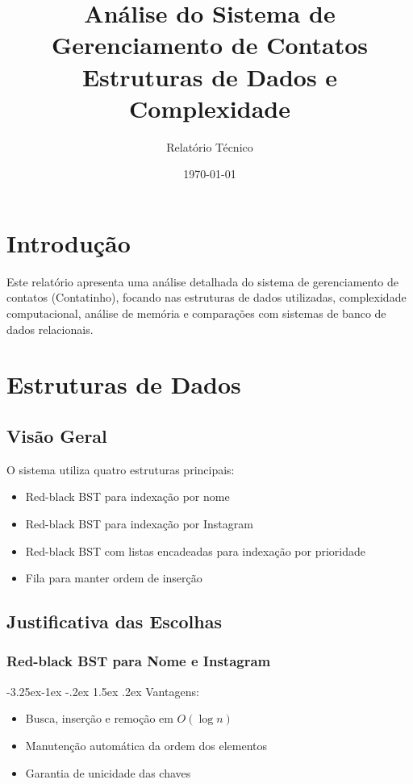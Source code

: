 \documentclass{article}
\title{Análise do Sistema de Gerenciamento de Contatos\\
\large Estruturas de Dados e Complexidade}
\author{Relatório Técnico}
\date{\today}
\makeatletter
\renewcommand\paragraph{\@startsection{paragraph}{4}{\z@}%
  {-3.25ex\@plus -1ex \@minus -.2ex}%
  {1.5ex \@plus .2ex}%
  {\normalfont\normalsize\bfseries}}
\makeatother
\begin{document}
\maketitle

\section{Introdução}
Este relatório apresenta uma análise detalhada do sistema de gerenciamento de contatos (Contatinho), focando nas estruturas de dados utilizadas, complexidade computacional, análise de memória e comparações com sistemas de banco de dados relacionais.

\section{Estruturas de Dados}
\subsection{Visão Geral}
O sistema utiliza quatro estruturas principais:
\begin{itemize}
    \item Red-black BST para indexação por nome
    \item Red-black BST para indexação por Instagram
    \item Red-black BST com listas encadeadas para indexação por prioridade
    \item Fila para manter ordem de inserção
\end{itemize}

\subsection{Justificativa das Escolhas}
\subsubsection{Red-black BST para Nome e Instagram}
\paragraph{Vantagens:}
\begin{itemize}
    \item Busca, inserção e remoção em $O(\log n)$
    \item Manutenção automática da ordem dos elementos
    \item Garantia de unicidade das chaves
\end{itemize}
\end{document}
